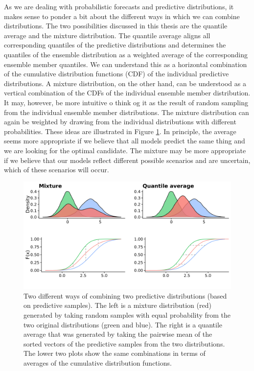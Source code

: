 \documentclass[
]{book}
\begin{document}
As we are dealing with probabilistic forecasts and predictive distributions, it makes sense to ponder a bit about the different ways in which we can combine distributions. The two possibilities discussed in this thesis are the quantile average and the mixture distribution. The quantile average aligns all corresponding quantiles of the predictive distributions and determines the quantiles of the ensemble distribution as a weighted average of the corresponding ensemble member quantiles. We can understand this as a horizontal combination of the cumulative distribution functions (CDF) of the individual predictive distributions. A mixture distribution, on the other hand, can be understood as a vertical combination of the CDFs of the individual ensemble member distribution. It may, however, be more intuitive o think og it as the result of random sampling from the individual ensemble member distributions. The mixture distribution can again be weighted by drawing from the individual distributions with different probabilities. These ideas are illustrated in Figure \ref{fig:average-mixture-example}. In principle, the average seems more appropriate if we believe that all models predict the same thing and we are looking for the optimal candidate. The mixture may be more appropriate if we believe that our models reflect different possible scenarios and are uncertain, which of these scenarios will occur.

\begin{figure}
\includegraphics[width=0.95\linewidth]{../visualisation/chapter-4-ensemble/average-mixture-example} \caption{Two different ways of combining two predictive distributions (based on predictive samples). The left is a mixture distribution (red) generated by taking random samples with equal probability from the two original distributions (green and blue). The right is a quantile average that was generated by taking the pairwise mean of the sorted vectors of the predictive samples from the two distributions. The lower two plots show the same combinations in terms of averages of the cumulative distribution functions.}\label{fig:average-mixture-example}
\end{figure}
\end{document}
